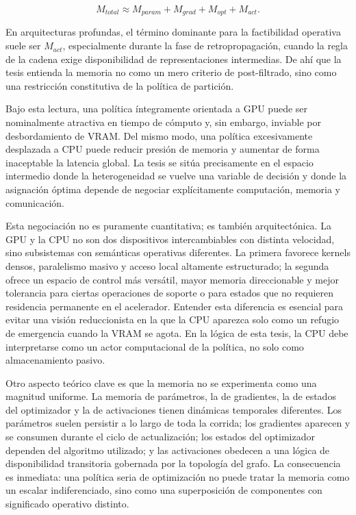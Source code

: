 $$
M_{total} \approx M_{param} + M_{grad} + M_{opt} + M_{act}.
$$

En arquitecturas profundas, el término dominante para la factibilidad operativa suele ser $M_{act}$, especialmente durante la fase de retropropagación, cuando la regla de la cadena exige disponibilidad de representaciones intermedias. De ahí que la tesis entienda la memoria no como un mero criterio de post-filtrado, sino como una restricción constitutiva de la política de partición.

Bajo esta lectura, una política íntegramente orientada a GPU puede ser nominalmente atractiva en tiempo de cómputo y, sin embargo, inviable por desbordamiento de VRAM. Del mismo modo, una política excesivamente desplazada a CPU puede reducir presión de memoria y aumentar de forma inaceptable la latencia global. La tesis se sitúa precisamente en el espacio intermedio donde la heterogeneidad se vuelve una variable de decisión y donde la asignación óptima depende de negociar explícitamente computación, memoria y comunicación.

Esta negociación no es puramente cuantitativa; es también arquitectónica. La GPU y la CPU no son dos dispositivos intercambiables con distinta velocidad, sino subsistemas con semánticas operativas diferentes. La primera favorece kernels densos, paralelismo masivo y acceso local altamente estructurado; la segunda ofrece un espacio de control más versátil, mayor memoria direccionable y mejor tolerancia para ciertas operaciones de soporte o para estados que no requieren residencia permanente en el acelerador. Entender esta diferencia es esencial para evitar una visión reduccionista en la que la CPU aparezca solo como un refugio de emergencia cuando la VRAM se agota. En la lógica de esta tesis, la CPU debe interpretarse como un actor computacional de la política, no solo como almacenamiento pasivo.

Otro aspecto teórico clave es que la memoria no se experimenta como una magnitud uniforme. La memoria de parámetros, la de gradientes, la de estados del optimizador y la de activaciones tienen dinámicas temporales diferentes. Los parámetros suelen persistir a lo largo de toda la corrida; los gradientes aparecen y se consumen durante el ciclo de actualización; los estados del optimizador dependen del algoritmo utilizado; y las activaciones obedecen a una lógica de disponibilidad transitoria gobernada por la topología del grafo. La consecuencia es inmediata: una política seria de optimización no puede tratar la memoria como un escalar indiferenciado, sino como una superposición de componentes con significado operativo distinto.

